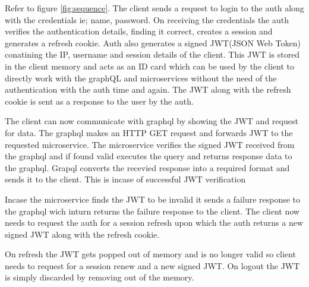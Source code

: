 Refer to figure \ref{fig:sequence}. The client sends a request to login to the auth along with the credentials ie; name, password.
On receiving the credentials the auth verifies the authentication details, finding it correct, creates a session and generates a refresh cookie.
Auth also generates a signed JWT(JSON Web Token) conatining the IP, username and session details of the client.
This JWT is stored in the client memory and acts as an ID card which can be used by the client to directly work with the graphQL and microservices without the need of the authentication with the auth time and again.
The JWT along with the refresh cookie is sent as a response to the user by the auth.

The client can now communicate with graphql by showing the JWT and request for data.
The graphql makes an HTTP GET request and forwards JWT to the requested microservice.
The microservice verifies the signed JWT received from the graphql and if found valid executes the query and returns response data to the graphql.
Grapql converts the recevied response into a required format and sends it to the client.
This is incase of successful JWT verification

Incase the microservice finds the JWT to be invalid it sends a failure response to the graphql wich inturn returns the failure response to the client.
The client now needs to request the auth for a session refresh upon which the auth returns a new signed JWT along with the refresh cookie.

On refresh the JWT gets popped out of memory and is no longer valid so client needs to request for a session renew and a new signed JWT.
On logout the JWT is simply discarded by removing out of the memory. 

